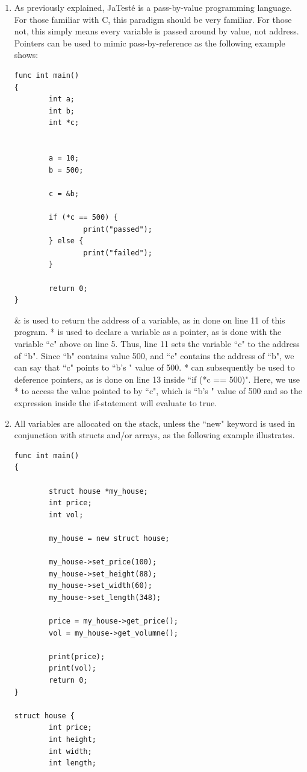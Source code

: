 \documentclass{article}
\begin{document}
\begin{enumerate}
\item
As previously explained, JaTest\'{e} is a pass-by-value programming language. For those familiar with C, this paradigm should be very familiar. For those not, this simply means every variable is passed around by value, not address. Pointers can be used to mimic pass-by-reference as the following example shows:
\begin{lstlisting}
func int main()
{
        int a;
        int b;
        int *c;


        a = 10;
        b = 500;

        c = &b;

        if (*c == 500) {
                print("passed");
        } else {
                print("failed");
        }

        return 0;
}
\end{lstlisting}
\& is used to return the address of a variable, as in done on line 11 of this program. * is used to declare a variable as a pointer, as is done with the variable ``c" above on line 5. Thus, line 11 sets the variable ``c" to the address of ``b". Since ``b" contains value 500, and ``c" contains the address of ``b", we can say that ``c" points to ``b's " value of 500.  * can subsequently be used to deference pointers, as is done on line 13 inside ``if (*c == 500)". Here, we use * to access the value pointed to by ``c", which is ``b's " value of 500 and so the expression inside the if-statement will evaluate to true. 

\item
All variables are allocated on the stack, unless the ``new" keyword is used in conjunction with structs and/or arrays, as the following example illustrates.
\begin{lstlisting}
func int main()
{
        
        struct house *my_house;
        int price;
        int vol;
        
        my_house = new struct house;
        
        my_house->set_price(100);
        my_house->set_height(88);
        my_house->set_width(60);
        my_house->set_length(348);
        
        price = my_house->get_price();
        vol = my_house->get_volumne();
        
        print(price);
        print(vol);
        return 0;
}

struct house {
        int price;
        int height;
        int width;
        int length;


\end{lstlisting}
\end{enumerate}
\end{document}
